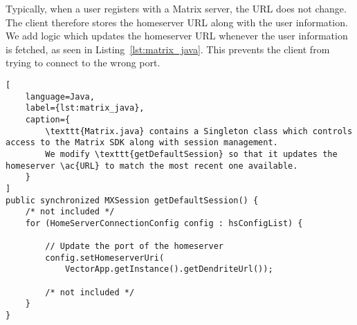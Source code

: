 Typically, when a user registers with a Matrix server, the \ac{URL} does not change.
The client therefore stores the homeserver \ac{URL} along with the user information.
We add logic which updates the homeserver \ac{URL} whenever the user information is fetched, as seen in Listing~\ref{lst:matrix_java}.
This prevents the client from trying to connect to the wrong port.

\begin{lstfloat}
	\begin{lstlisting}[
    language=Java,
    label={lst:matrix_java},
    caption={
        \texttt{Matrix.java} contains a Singleton class which controls access to the Matrix SDK along with session management.
        We modify \texttt{getDefaultSession} so that it updates the homeserver \ac{URL} to match the most recent one available.
    }
]
public synchronized MXSession getDefaultSession() {
    /* not included */
    for (HomeServerConnectionConfig config : hsConfigList) {

        // Update the port of the homeserver
        config.setHomeserverUri(
            VectorApp.getInstance().getDendriteUrl());

        /* not included */
    }
}
\end{lstlisting}
\end{lstfloat}

